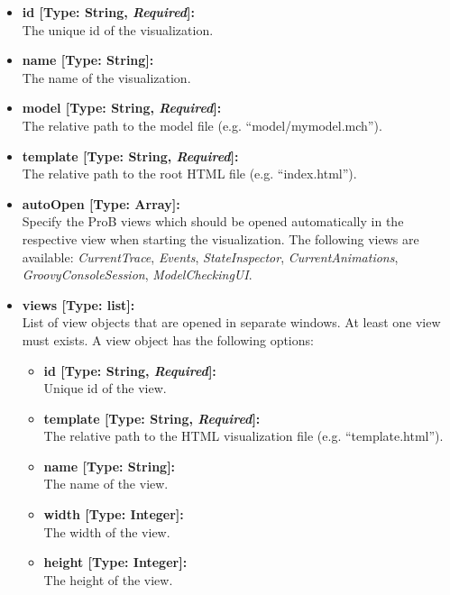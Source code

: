 \begin{itemize}
	\item[] \textbf{id [Type: String, \textit{Required}]:}\\The unique id of the visualization.
	\item[] \textbf{name [Type: String]:}\\The name of the visualization.
	\item[] \textbf{model [Type: String, \textit{Required}]:}\\The relative path to the model file (e.g. ``model/mymodel.mch'').
	\item[] \textbf{template [Type: String, \textit{Required}]:}\\The relative path to the root HTML file (e.g. ``index.html'').
	\item[] \textbf{autoOpen [Type: Array]:}\\Specify the ProB views which should be opened automatically in the respective view when starting the visualization. 
The following views are available: \textit{CurrentTrace}, \textit{Events}, \textit{StateInspector}, \textit{CurrentAnimations}, \textit{GroovyConsoleSession}, \textit{ModelCheckingUI}.
	\item[] \textbf{views [Type: list]:}\\ List of view objects that are opened in separate windows.
	At least one view must exists.
	A view object has the following options:
	\begin{itemize}
		\item[] \textbf{id [Type: String, \textit{Required}]:}\\ Unique id of the view.
		\item[] \textbf{template [Type: String, \textit{Required}]:}\\ The relative path to the HTML visualization file (e.g. ``template.html'').
		\item[] \textbf{name [Type: String]:}\\ The name of the view.
		\item[] \textbf{width [Type: Integer]:}\\ The width of the view.
		\item[] \textbf{height [Type: Integer]:}\\ The height of the view.
	\end{itemize}
\end{itemize}

